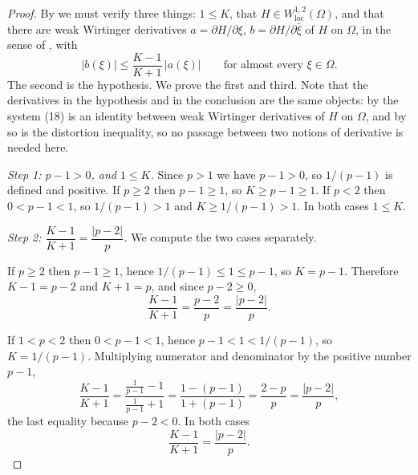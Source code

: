 \begin{proof}
By  we must verify three things: $1\le K$, that
$H\in W^{1,2}_{\mathrm{loc}}(\Omega)$, and that there are weak Wirtinger
derivatives $a=\partial H/\partial\xi$, $b=\partial H/\partial\bar\xi$ of $H$
on $\Omega$, in the sense of , with
\begin{equation}\tag{11}
  |b(\xi)|\le\frac{K-1}{K+1}\,|a(\xi)|
  \qquad\text{for almost every }\xi\in\Omega .
\end{equation}
The second is the hypothesis.  We prove the first and third.  Note that the
derivatives in the hypothesis and in the conclusion are the same objects: by
 the system (18) is an identity between weak Wirtinger
derivatives of $H$ on $\Omega$, and by  so is the
distortion inequality, so no passage between two notions of derivative is
needed here.

\emph{Step 1: $p-1>0$, and $1\le K$.}  Since $p>1$ we have $p-1>0$, so
$1/(p-1)$ is defined and positive.  If $p\ge2$ then $p-1\ge1$, so
$K\ge p-1\ge1$.  If $p<2$ then $0<p-1<1$, so $1/(p-1)>1$ and $K\ge1/(p-1)>1$.
In both cases $1\le K$.

\emph{Step 2: $\dfrac{K-1}{K+1}=\dfrac{|p-2|}{p}$.}  We compute the two cases
separately.

If $p\ge2$ then $p-1\ge1$, hence $1/(p-1)\le1\le p-1$, so $K=p-1$.  Therefore
$K-1=p-2$ and $K+1=p$, and since $p-2\ge0$,
\[
  \frac{K-1}{K+1}=\frac{p-2}{p}=\frac{|p-2|}{p}.
\]

If $1<p<2$ then $0<p-1<1$, hence $p-1<1<1/(p-1)$, so $K=1/(p-1)$.  Multiplying
numerator and denominator by the positive number $p-1$,
\[
  \frac{K-1}{K+1}=\frac{\frac1{p-1}-1}{\frac1{p-1}+1}
  =\frac{1-(p-1)}{1+(p-1)}=\frac{2-p}{p}=\frac{|p-2|}{p},
\]
the last equality because $p-2<0$.  In both cases
\begin{equation}\tag{1}
  \frac{K-1}{K+1}=\frac{|p-2|}{p}.
\end{equation}


\end{proof}
